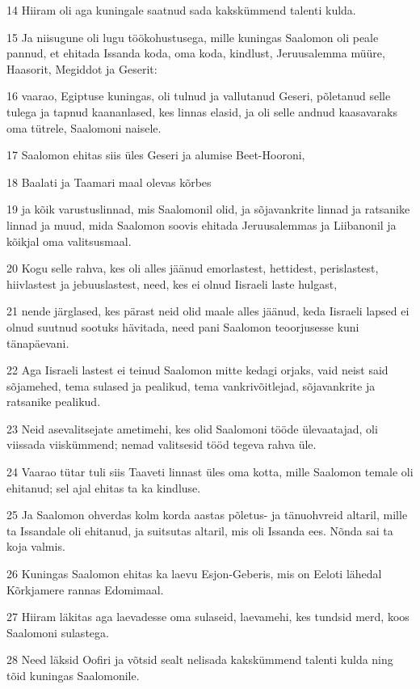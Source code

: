 \par 14 Hiiram oli aga kuningale saatnud sada kakskümmend talenti kulda.
\par 15 Ja niisugune oli lugu töökohustusega, mille kuningas Saalomon oli peale pannud, et ehitada Issanda koda, oma koda, kindlust, Jeruusalemma müüre, Haasorit, Megiddot ja Geserit:
\par 16 vaarao, Egiptuse kuningas, oli tulnud ja vallutanud Geseri, põletanud selle tulega ja tapnud kaananlased, kes linnas elasid, ja oli selle andnud kaasavaraks oma tütrele, Saalomoni naisele.
\par 17 Saalomon ehitas siis üles Geseri ja alumise Beet-Hooroni,
\par 18 Baalati ja Taamari maal olevas kõrbes
\par 19 ja kõik varustuslinnad, mis Saalomonil olid, ja sõjavankrite linnad ja ratsanike linnad ja muud, mida Saalomon soovis ehitada Jeruusalemmas ja Liibanonil ja kõikjal oma valitsusmaal.
\par 20 Kogu selle rahva, kes oli alles jäänud emorlastest, hettidest, perislastest, hiivlastest ja jebuuslastest, need, kes ei olnud Iisraeli laste hulgast,
\par 21 nende järglased, kes pärast neid olid maale alles jäänud, keda Iisraeli lapsed ei olnud suutnud sootuks hävitada, need pani Saalomon teoorjusesse kuni tänapäevani.
\par 22 Aga Iisraeli lastest ei teinud Saalomon mitte kedagi orjaks, vaid neist said sõjamehed, tema sulased ja pealikud, tema vankrivõitlejad, sõjavankrite ja ratsanike pealikud.
\par 23 Neid asevalitsejate ametimehi, kes olid Saalomoni tööde ülevaatajad, oli viissada viiskümmend; nemad valitsesid tööd tegeva rahva üle.
\par 24 Vaarao tütar tuli siis Taaveti linnast üles oma kotta, mille Saalomon temale oli ehitanud; sel ajal ehitas ta ka kindluse.
\par 25 Ja Saalomon ohverdas kolm korda aastas põletus- ja tänuohvreid altaril, mille ta Issandale oli ehitanud, ja suitsutas altaril, mis oli Issanda ees. Nõnda sai ta koja valmis.
\par 26 Kuningas Saalomon ehitas ka laevu Esjon-Geberis, mis on Eeloti lähedal Kõrkjamere rannas Edomimaal.
\par 27 Hiiram läkitas aga laevadesse oma sulaseid, laevamehi, kes tundsid merd, koos Saalomoni sulastega.
\par 28 Need läksid Oofiri ja võtsid sealt nelisada kakskümmend talenti kulda ning tõid kuningas Saalomonile.

